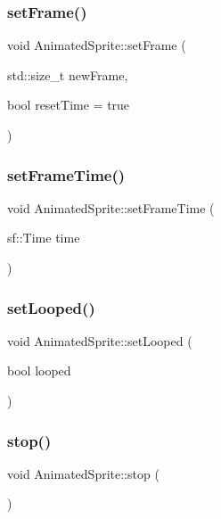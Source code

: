 \subsubsection{\texorpdfstring{set\+Frame()}{setFrame()}}
{\footnotesize\ttfamily void Animated\+Sprite\+::set\+Frame (\begin{DoxyParamCaption}\item[{std\+::size\+\_\+t}]{new\+Frame,  }\item[{bool}]{reset\+Time = {\ttfamily true} }\end{DoxyParamCaption})}

\mbox{\label{class_animated_sprite_af598fab5c3599ccc5ed1e2d4fefa68cc}} 
\subsubsection{\texorpdfstring{set\+Frame\+Time()}{setFrameTime()}}
{\footnotesize\ttfamily void Animated\+Sprite\+::set\+Frame\+Time (\begin{DoxyParamCaption}\item[{sf\+::\+Time}]{time }\end{DoxyParamCaption})}

\mbox{\label{class_animated_sprite_a855a5a48ea2e1c51c7c9304857dd2f8c}} 
\subsubsection{\texorpdfstring{set\+Looped()}{setLooped()}}
{\footnotesize\ttfamily void Animated\+Sprite\+::set\+Looped (\begin{DoxyParamCaption}\item[{bool}]{looped }\end{DoxyParamCaption})}

\mbox{\label{class_animated_sprite_af9734f4346d3d2370322b2dcaeef133c}} 
\subsubsection{\texorpdfstring{stop()}{stop()}}
{\footnotesize\ttfamily void Animated\+Sprite\+::stop (\begin{DoxyParamCaption}{ }\end{DoxyParamCaption})}

